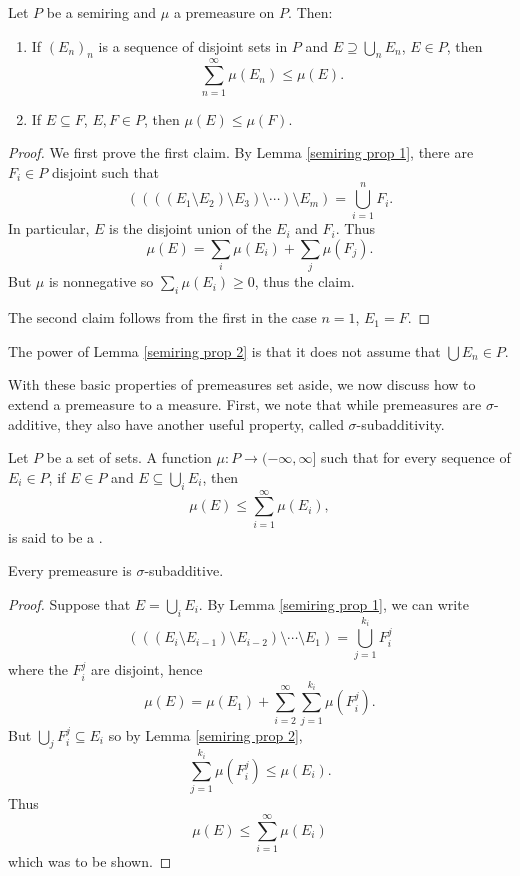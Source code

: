 \begin{lemma}
\label{semiring prop 2}
Let $P$ be a semiring and $\mu$ a premeasure on $P$. Then:
\begin{enumerate}
\item If $(E_{n})_{n}$ is a sequence of disjoint sets in $P$ and $E \supseteq \bigcup_{n} E_{n}$, $E \in P$, then
\[\sum_{n=1}^{\infty} \mu(E_{n}) \leq \mu(E).\]
\item If $E \subseteq F$, $E, F \in P$, then $\mu(E) \leq \mu(F)$.
\end{enumerate}
\end{lemma}
\begin{proof}
We first prove the first claim. By Lemma \ref{semiring prop 1}, there are $F_{i} \in P$ disjoint such that
\[((((E_1 \setminus E_2) \setminus E_3) \setminus \cdots) \setminus E_{m}) = \bigcup_{i=1}^{n} F_i.\]
In particular, $E$ is the disjoint union of the $E_i$ and $F_i$. Thus
\[\mu(E) = \sum_{i} \mu(E_i) + \sum_{j} \mu(F_{j}).\]
But $\mu$ is nonnegative so $\sum_{i} \mu(E_i) \geq 0$, thus the claim.

The second claim follows from the first in the case $n = 1$, $E_1 = F$.
\end{proof}

\begin{subsec}
The power of Lemma \ref{semiring prop 2} is that it does not assume that $\bigcup E_{n} \in P$.
\end{subsec}

\begin{subsec}
With these basic properties of premeasures set aside, we now discuss how to extend a premeasure to a measure.
First, we note that while premeasures are $\sigma$-additive, they also have another useful property, called $\sigma$-subadditivity.
\end{subsec}

\begin{definition}
Let $P$ be a set of sets. A function $\mu: P \to (-\infty, \infty]$ such that for every sequence of $E_{i} \in P$, if $E \in P$ and $E \subseteq \bigcup_{i} E_i$, then
\[\mu(E) \leq \sum_{i=1}^{\infty} \mu(E_i),\]
is said to be a .
\end{definition}

\begin{lemma}
Every premeasure is $\sigma$-subadditive.
\end{lemma}
\begin{proof}
Suppose that $E = \bigcup_{i} E_i$. By Lemma \ref{semiring prop 1}, we can write
\[(((E_{i} \setminus E_{i-1}) \setminus E_{i-2}) \setminus \cdots \setminus E_1) = \bigcup_{j=1}^{k_i} F_i^j\]
where the $F_i^j$ are disjoint, hence
\[\mu(E) = \mu(E_1) + \sum_{i=2}^{\infty} \sum_{j=1}^{k_i} \mu(F_i^j).\]
But $\bigcup_{j} F_i^{j} \subseteq E_i$ so by Lemma \ref{semiring prop 2},
\[\sum_{j=1}^{k_i} \mu(F_i^j) \leq \mu(E_i).\]
Thus
\[\mu(E) \leq \sum_{i=1}^{\infty} \mu(E_i)\]
which was to be shown.
\end{proof}

